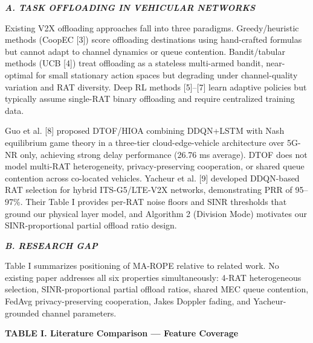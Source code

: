 \documentclass[journal,10pt,twocolumn]{IEEEtran}
\begin{document}
\emph{\textbf{A. TASK OFFLOADING IN VEHICULAR NETWORKS}}

Existing V2X offloading approaches fall into three paradigms.
Greedy/heuristic methods (CoopEC {[}3{]}) score offloading destinations
using hand-crafted formulas but cannot adapt to channel dynamics or
queue contention. Bandit/tabular methods (UCB {[}4{]}) treat offloading
as a stateless multi-armed bandit, near-optimal for small stationary
action spaces but degrading under channel-quality variation and RAT
diversity. Deep RL methods {[}5{]}--{[}7{]} learn adaptive policies but
typically assume single-RAT binary offloading and require centralized
training data.

Guo et al. {[}8{]} proposed DTOF/HIOA combining DDQN+LSTM with Nash
equilibrium game theory in a three-tier cloud-edge-vehicle architecture
over 5G-NR only, achieving strong delay performance (26.76 ms average).
DTOF does not model multi-RAT heterogeneity, privacy-preserving
cooperation, or shared queue contention across co-located vehicles.
Yacheur et al. {[}9{]} developed DDQN-based RAT selection for hybrid
ITS-G5/LTE-V2X networks, demonstrating PRR of 95--97\%. Their Table I
provides per-RAT noise floors and SINR thresholds that ground our
physical layer model, and Algorithm 2 (Division Mode) motivates our
SINR-proportional partial offload ratio design.

\emph{\textbf{B. RESEARCH GAP}}

Table I summarizes positioning of MA-ROPE relative to related work. No
existing paper addresses all six properties simultaneously: 4-RAT
heterogeneous selection, SINR-proportional partial offload ratios,
shared MEC queue contention, FedAvg privacy-preserving cooperation,
Jakes Doppler fading, and Yacheur-grounded channel parameters.

\textbf{TABLE I. Literature Comparison --- Feature Coverage}
\end{document}

